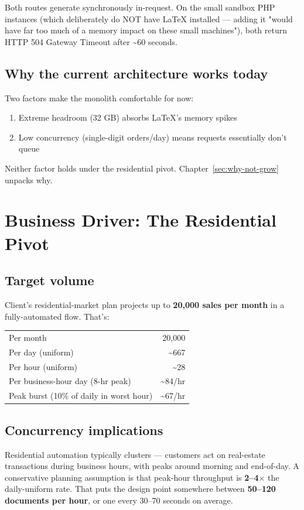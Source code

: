 \documentclass[11pt,letterpaper]{article}
\begin{document}
Both routes generate synchronously in-request. On the small sandbox PHP instances (which deliberately do NOT have LaTeX installed --- adding it "would have far too much of a memory impact on these small machines"), both return HTTP 504 Gateway Timeout after \textasciitilde 60 seconds.

\subsection{Why the current architecture works today}
Two factors make the monolith comfortable for now:
\begin{enumerate}[nosep]
  \item Extreme headroom (32 GB) absorbs LaTeX's memory spikes
  \item Low concurrency (single-digit orders/day) means requests essentially don't queue
\end{enumerate}
Neither factor holds under the residential pivot. Chapter~\ref{sec:why-not-grow} unpacks why.

\newpage

\section{Business Driver: The Residential Pivot}
\label{sec:business-driver}

\subsection{Target volume}
Client's residential-market plan projects up to \textbf{20{,}000 sales per month} in a fully-automated flow. That's:

\begin{center}
\begin{tabular}{lr}
\toprule
Per month & 20{,}000 \\
Per day (uniform) & \textasciitilde 667 \\
Per hour (uniform) & \textasciitilde 28 \\
Per business-hour day (8-hr peak) & \textasciitilde 84/hr \\
Peak burst (10\% of daily in worst hour) & \textasciitilde 67/hr \\
\bottomrule
\end{tabular}
\end{center}

\subsection{Concurrency implications}
Residential automation typically clusters --- customers act on real-estate transactions during business hours, with peaks around morning and end-of-day. A conservative planning assumption is that peak-hour throughput is \textbf{2--4$\times$} the daily-uniform rate. That puts the design point somewhere between \textbf{50--120 documents per hour}, or one every 30--70 seconds on average.
\end{document}
